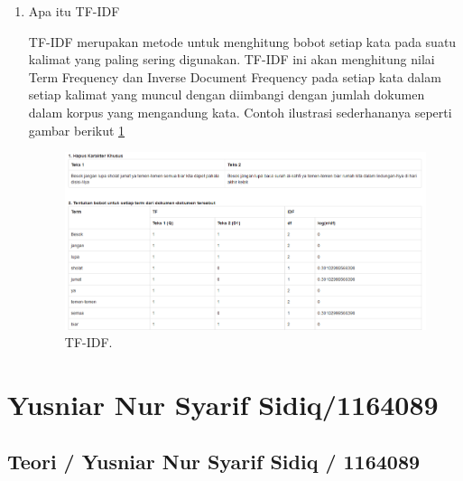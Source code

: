 \begin{enumerate}
\item Apa itu TF-IDF \par
TF-IDF merupakan metode untuk menghitung bobot setiap kata pada suatu kalimat yang paling sering digunakan. TF-IDF ini akan menghitung nilai Term Frequency dan Inverse Document Frequency pada setiap kata dalam setiap kalimat yang muncul dengan diimbangi dengan jumlah dokumen dalam korpus yang mengandung kata. Contoh ilustrasi sederhananya seperti gambar berikut \ref{Teks6}
		\begin{figure}[ht]
		\centerline{\includegraphics[width=1\textwidth]{figures/im/teks6.png}}
		\caption{TF-IDF.}
		\label{Teks6}
		\end{figure}
\end{enumerate}

\section{Yusniar Nur Syarif Sidiq/1164089}
\subsection{Teori / Yusniar Nur Syarif Sidiq / 1164089}

